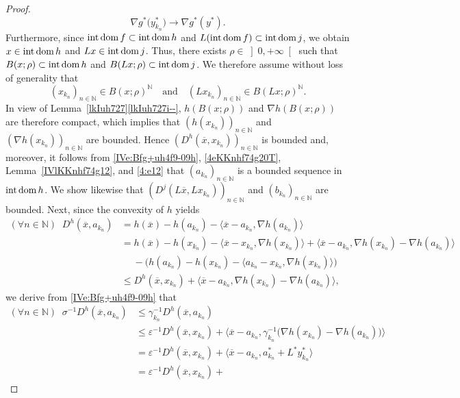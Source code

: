 \documentclass[a4paper,11pt,fleqn]{article}
\renewcommand{\leq}{\ensuremath{\leqslant}}
\newcommand{\pair}[2]{\langle{{#1},{#2}}\rangle}
\newcommand{\Pair}[2]{\big\langle{{#1},{#2}}\big\rangle}
\newcommand{\RPP}{\ensuremath{\left]0,+\infty\right[}}
\newcommand{\NN}{\ensuremath{\mathbb N}}
\newcommand{\dom}{\ensuremath{\text{\rm dom}\,}}
\newcommand{\inte}{\ensuremath{\text{\rm int}\,}}
\newcommand{\intdom}{\ensuremath{\text{\rm int\,dom}\,}}
\theoremstyle{plain}{\theorembodyfont{\rmfamily}%
\newtheorem{conjecture}[theorem]{Conjecture}}
\theoremstyle{plain}{\theorembodyfont{\rmfamily}%
\newtheorem{example}[theorem]{Example}}
\theoremstyle{plain}{\theorembodyfont{\rmfamily}%
\newtheorem{remark}[theorem]{Remark}}
\theoremstyle{plain}{\theorembodyfont{\rmfamily}%
\newtheorem{algorithm}[theorem]{Algorithm}}
\theoremstyle{plain}{\theorembodyfont{\rmfamily}%
\newtheorem{condition}[theorem]{Condition}}
\theoremstyle{plain}{\theorembodyfont{\rmfamily}%
\newtheorem{definition}[theorem]{Definition}}
\theoremstyle{plain}{\theorembodyfont{\rmfamily}
\newtheorem{problem}[theorem]{Problem}}
\theoremstyle{plain}{\theorembodyfont{\rmfamily}
\newtheorem{notation}[theorem]{Notation}}
\numberwithin{equation}{section}
\begin{document}
\begin{proof}
\begin{equation}
\nabla g^*\big(y_{k_n}^*\big)\to\nabla g^*(y^*).
\end{equation}
Furthermore, since $\inte\dom f\subset\inte\dom h$ 
and $L(\inte\dom f)\subset\inte\dom j$, we obtain
$x\in\intdom h$ and $Lx\in\intdom j$. Thus, there exists 
$\rho\in\RPP$ such that $B(x;\rho)\subset\intdom h$ and
$B(Lx;\rho)\subset\intdom j$.
We therefore assume without loss of generality that 
\begin{equation}
\label{4ekIuh716a}
(x_{k_n})_{n\in\NN}\in B(x;\rho)^{\NN}
\quad\text{and}\quad 
(Lx_{k_n})_{n\in\NN}\in B(Lx;\rho)^{\NN}.
\end{equation}
In view of Lemma~\ref{lkIuh727}\ref{lkIuh727i--},
$h({B(x;\rho)})$ and $\nabla h({B(x;\rho)})$ are therefore compact,
which implies that $(h(x_{k_n}))_{n\in\NN}$ and 
$(\nabla h(x_{k_n}))_{n\in\NN}$ are bounded. 
Hence $(D^h(\overline{x},x_{k_n}))_{n\in\NN}$ is bounded and, 
moreover, it follows from \eqref{IVe:Bfg+uh4f9-09h}, 
\eqref{4eKKnhf74g20T}, Lemma~\ref{IVlKKnhf74g12}, 
and \eqref{4:e12} that $(a_{k_n})_{n\in\NN}$ 
is a bounded sequence in $\intdom h$. 
We show likewise that $(D^j(L\overline{x},Lx_{k_n}))_{n\in\NN}$ 
and $(b_{k_n})_{n\in\NN}$ are bounded. 
Next, since the convexity of $h$ yields 
\begin{align}
(\forall n\in\NN)\;\;
D^h(\overline{x},a_{k_n})
&=h(\overline{x})-h(a_{k_n})-\pair{\overline{x}-a_{k_n}}
{\nabla h(a_{k_n})}\nonumber\\
&=h(\overline{x})-h(x_{k_n})-\pair{\overline{x}-x_{k_n}}
{\nabla h(x_{k_n})}+\Pair{\overline{x}-a_{k_n}}
{\nabla h(x_{k_n})-\nabla h(a_{k_n})}\nonumber\\
&\quad\;-\big(h(a_{k_n})-h(x_{k_n})-\pair{a_{k_n}-x_{k_n}}
{\nabla h(x_{k_n})}\big)\nonumber\\
&\leq D^h(\overline{x},x_{k_n})+\Pair{\overline{x}-a_{k_n}}
{\nabla h(x_{k_n})-\nabla h(a_{k_n})},
\end{align}
we derive from \eqref{IVe:Bfg+uh4f9-09h} that
\begin{align}
\label{4ekIuh722a}
(\forall n\in\NN)\;\;
\sigma^{-1}D^h(\overline{x},a_{k_n})
&\leq\gamma_{k_n}^{-1}D^h(\overline{x},a_{k_n})\nonumber\\
&\leq\varepsilon^{-1}D^h(\overline{x},x_{k_n})+
\Pair{\overline{x}-a_{k_n}}{\gamma_{k_n}^{-1}\big(
\nabla h(x_{k_n})-\nabla h(a_{k_n})\big)}\nonumber\\
&=\varepsilon^{-1}D^h(\overline{x},x_{k_n})+
\pair{\overline{x}-a_{k_n}}{a^*_{k_n}+L^*y^*_{k_n}}\nonumber\\
&=\varepsilon^{-1}D^h(\overline{x},x_{k_n})+

\end{align}
\end{proof}
\end{document}
